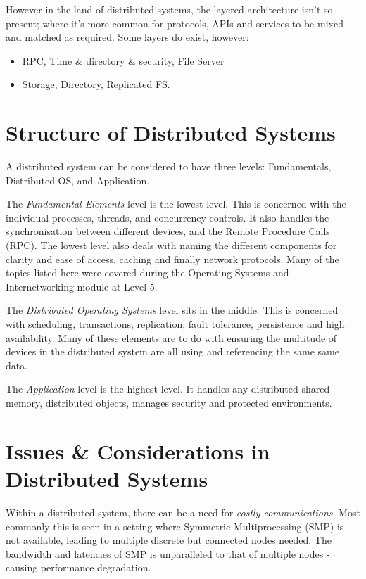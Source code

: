 However in the land of distributed systems, the layered architecture isn't so present; where it's more common for protocols, APIs and services to be mixed and matched as required. Some layers do exist, however:
\begin{itemize}
    \item RPC, Time \& directory \& security, File Server
    \item Storage, Directory, Replicated FS.
\end{itemize}

\section{Structure of Distributed Systems}
A distributed system can be considered to have three levels: Fundamentals, Distributed OS, and Application.

The \textit{Fundamental Elements} level is the lowest level. This is concerned with the individual processes, threads, and concurrency controls. It also handles the synchronisation between different devices, and the Remote Procedure Calls (RPC). The lowest level also deals with naming the different components for clarity and ease of access, caching and finally network protocols. Many of the topics listed here were covered during the Operating Systems and Internetworking module at Level 5.

The \textit{Distributed Operating Systems} level sits in the middle. This is concerned with scheduling, transactions, replication, fault tolerance, persistence and high availability. Many of these elements are to do with ensuring the multitude of devices in the distributed system are all using and referencing the same same data. 

The \textit{Application} level is the highest level. It handles any distributed shared memory, distributed objects, manages security and protected environments. 

\section{Issues \& Considerations in Distributed Systems}
Within a distributed system, there can be a need for \textit{costly communications}. Most commonly this is seen in a setting where Symmetric Multiprocessing (SMP) is not available, leading to multiple discrete but connected nodes needed. The bandwidth and latencies of SMP is unparalleled to that of multiple nodes - causing performance degradation.

